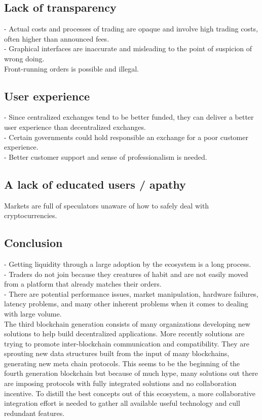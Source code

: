 \documentclass[]{article}
\begin{document}
	\subsection{Lack of transparency}
	- Actual costs and processes of trading are opaque and involve high trading costs, often higher than announced fees.\\ 
	- Graphical interfaces are inaccurate and misleading to the point of suspicion of wrong doing.\\
	Front-running orders is possible and illegal.
	\subsection{User experience}
	- Since centralized exchanges tend to be better funded, they can deliver a better user experience than decentralized exchanges.\\ 
	- Certain governments could hold responsible an exchange for a poor customer experience.\\
	- Better customer support and sense of professionalism is needed.
	
	\subsection{A lack of educated users / apathy}
	Markets are full of speculators unaware of how to safely deal with cryptocurrencies.
	
	\subsection{Conclusion}
	- Getting liquidity through a large adoption by the ecosystem is a long process.\\
	- Traders do not join because they creatures of habit and are not easily moved from a platform that already matches their orders. \\ 
	
	- There are potential performance issues, market manipulation, hardware failures, latency problems, and many other inherent problems when it comes to dealing with large volume.\\
	
	The third blockchain generation consists of many organizations developing new solutions to help build decentralized applications. More recently solutions are trying to promote inter-blockchain communication and compatibility. They are sprouting new data structures built from the input of many blockchains, generating new meta chain protocols. This seems to be the beginning of the fourth generation blockchain but because of much hype, many solutions out there are imposing protocols with fully integrated solutions and no collaboration incentive.
	To distill the best concepts out of this ecosystem, a more collaborative integration effort is needed to gather all available useful technology and cull redundant features.
\end{document}
